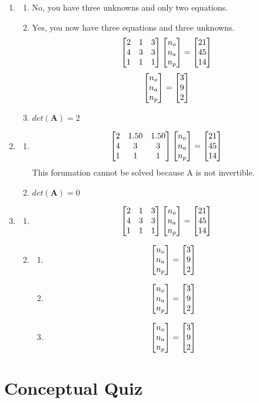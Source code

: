 \begin{sol}
    \begin{enumerate}
        \item \begin{enumerate}
            \item No, you have three unknowns and only two equations.
            \item Yes, you now have three equations and three unknowns. \[ \begin{bmatrix} 2 & 1 & 3 \\ 4 & 3 & 3 \\ 1 & 1 & 1 \end{bmatrix}\begin{bmatrix} n_{o} \\ n{_a} \\ n_{p} \end{bmatrix}=\begin{bmatrix} 21 \\ 45 \\ 14 \end{bmatrix} \] \[\begin{bmatrix} n_{o} \\ n{_a} \\ n_{p} \end{bmatrix}=\begin{bmatrix} 3 \\ 9 \\ 2 \end{bmatrix} \]
            \item $det(\mathbf{A})=2$
        \end{enumerate}
        \item \begin{enumerate}
            \item \[ \begin{bmatrix} 2 & 1.50 & 1.50 \\ 4 & 3 & 3 \\ 1 & 1 & 1 \end{bmatrix}\begin{bmatrix} n_{o} \\ n{_a} \\ n_{p} \end{bmatrix}=\begin{bmatrix} 21 \\ 45 \\ 14 \end{bmatrix} \] This forumation cannot be solved because A is not invertible.
            \item $det(\mathbf{A})=0$
        \end{enumerate}
        \item \begin{enumerate}
            \item \[ \begin{bmatrix} 2 & 1 & 3 \\ 4 & 3 & 3 \\ 1 & 1 & 1 \end{bmatrix}\begin{bmatrix} n_{o} \\ n{_a} \\ n_{p} \end{bmatrix}=\begin{bmatrix} 21 \\ 45 \\ 14 \end{bmatrix} \] 
            \item \begin{enumerate}
                \item \[\begin{bmatrix} n_{o} \\ n{_a} \\ n_{p} \end{bmatrix}=\begin{bmatrix} 3 \\ 9 \\ 2 \end{bmatrix} \]
                \item \[\begin{bmatrix} n_{o} \\ n{_a} \\ n_{p} \end{bmatrix}=\begin{bmatrix} 3 \\ 9 \\ 2 \end{bmatrix} \]
                \item \[\begin{bmatrix} n_{o} \\ n{_a} \\ n_{p} \end{bmatrix}=\begin{bmatrix} 3 \\ 9 \\ 2 \end{bmatrix} \]
            \end{enumerate}
        \end{enumerate}
    \end{enumerate}
\end{sol}

\section{Conceptual Quiz}


